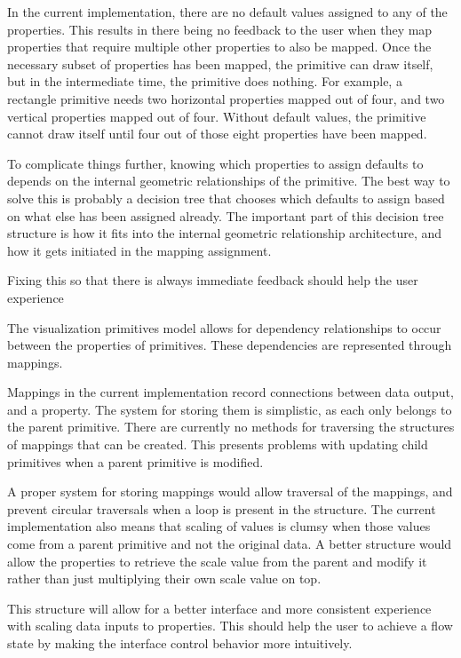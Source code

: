 \label{defaultValues}
In the current implementation, there are no default values assigned to any of the properties.
This results in there being no feedback to the user when they map properties that require multiple other properties to also be mapped.
Once the necessary subset of properties has been mapped, the primitive can draw itself, but in the intermediate time, the primitive does nothing.
For example, a rectangle primitive needs two horizontal properties mapped out of four, and two vertical properties mapped out of four.
Without default values, the primitive cannot draw itself until four out of those eight properties have been mapped.

To complicate things further, knowing which properties to assign defaults to depends on the internal geometric relationships of the primitive.
The best way to solve this is probably a decision tree that chooses which defaults to assign based on what else has been assigned already.
The important part of this decision tree structure is how it fits into the internal geometric relationship architecture, and how it gets initiated in the mapping assignment.

Fixing this so that there is always immediate feedback should help the user experience 

\label{primitivesGraph}
The visualization primitives model allows for dependency relationships to occur between the properties of primitives.
These dependencies are represented through mappings.

Mappings in the current implementation record connections between data output, and a property.
The system for storing them is simplistic, as each only belongs to the parent primitive.
There are currently no methods for traversing the structures of mappings that can be created.
This presents problems with updating child primitives when a parent primitive is modified.

A proper system for storing mappings would allow traversal of the mappings, and prevent circular traversals when a loop is present in the structure.
The current implementation also means that scaling of values is clumsy when those values come from a parent primitive and not the original data.
A better structure would allow the properties to retrieve the scale value from the parent and modify it rather than just multiplying their own scale value on top.

This structure will allow for a better interface and more consistent experience with scaling data inputs to properties.
This should help the user to achieve a flow state by making the interface control behavior more intuitively.


